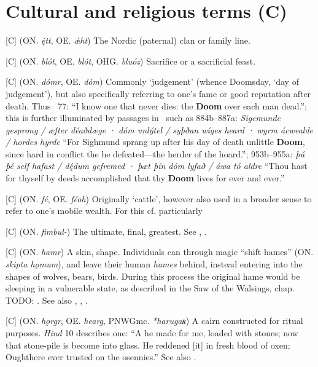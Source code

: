 
\section{Cultural and religious terms (C)}
\begin{itemize}

[C] (ON. \emph{ę́tt}, OE. \emph{ǽht})
  The Nordic (paternal) clan or family line.

[C] (ON. \emph{blót}, OE. \emph{blót}, OHG. \emph{bluóz})
  Sacrifice or a sacrificial feast.

[C] (ON. \emph{dómr}, OE. \emph{dóm})
  Commonly ‘judgement’ (whence Doomsday, ‘day of judgement’), but also specifically referring to one’s fame or good reputation after death. Thus \Havamal\ 77: “I know one that never dies: the \textbf{Doom} over each man dead.”; this is further illuminated by passages in \Beowulf\ such as 884b–887a: \emph{Sigemunde gesprong / æfter déaðdæge · dóm unlýtel / syþðan wíges heard · wyrm ácwealde / hordes hyrde} “For Sighmund sprang up after his day of death unlittle \textbf{Doom}, since hard in conflict the  he defeated—the herder of the hoard.”; 953b–955a: \emph{þú þé self hafast / dę́dum gefremed · þæt þín dóm lyfað / áwa tó aldre} “Thou hast for thyself by deeds accomplished that thy \textbf{Doom} lives for ever and ever.”

[C] (ON. \emph{fé}, OE. \emph{féoh})
  Originally ‘cattle’, however also used in a broader sense to refer to one’s mobile wealth. For this cf. particularly \Havamal

[C] (ON. \emph{fimbul-})
  The ultimate, final, greatest. See , .

[C] (ON. \emph{hamr})
  A skin, shape. Individuals can through magic “shift hames” (ON. \emph{skipta hǫmum}), and leave their human \emph{hames} behind, instead entering into the shapes of wolves, bears, birds. During this process the original hame would be sleeping in a vulnerable state, as described in the Saw of the Walsings, chap. TODO: . See also , , .

[C] (ON. \emph{hǫrgr}, OE. \emph{hearg}, PNWGmc. \emph{*harugaʀ})
  A cairn constructed for ritual purposes. \emph{Hind} 10 describes one: “A  he made for me, loaded with stones; now that stone-pile is become into glass. He reddened [it] in fresh blood of oxen; Oughthere ever trusted on the osennies.” See also .


\end{itemize}
